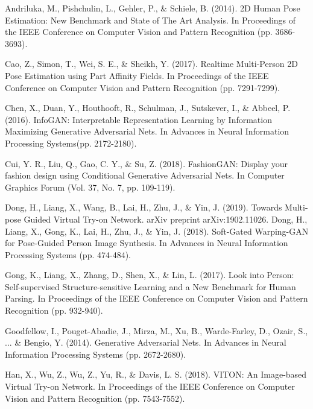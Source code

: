 \documentclass[11pt]{article}
\begin{document}
\medskip
\begin{thebibliography}{34}

Andriluka, M., Pishchulin, L., Gehler, P., \& Schiele, B. (2014). 2D Human Pose Estimation: New Benchmark and State of The Art Analysis. In Proceedings of the IEEE Conference on Computer Vision and Pattern Recognition (pp. 3686-3693).

Cao, Z., Simon, T., Wei, S. E., \& Sheikh, Y. (2017). Realtime Multi-Person 2D Pose Estimation using Part Affinity Fields. In Proceedings of the IEEE Conference on Computer Vision and Pattern Recognition (pp. 7291-7299).

Chen, X., Duan, Y., Houthooft, R., Schulman, J., Sutskever, I., \& Abbeel, P. (2016). InfoGAN: Interpretable Representation Learning by Information Maximizing Generative Adversarial Nets. In Advances in Neural Information Processing Systems(pp. 2172-2180).


Cui, Y. R., Liu, Q., Gao, C. Y., \& Su, Z. (2018). FashionGAN: Display your fashion design using Conditional Generative Adversarial Nets. In Computer Graphics Forum (Vol. 37, No. 7, pp. 109-119).


Dong, H., Liang, X., Wang, B., Lai, H., Zhu, J., \& Yin, J. (2019). Towards Multi-pose Guided Virtual Try-on Network. arXiv preprint arXiv:1902.11026.
Dong, H., Liang, X., Gong, K., Lai, H., Zhu, J., \& Yin, J. (2018). Soft-Gated Warping-GAN for Pose-Guided Person Image Synthesis. In Advances in Neural Information Processing Systems (pp. 474-484).

Gong, K., Liang, X., Zhang, D., Shen, X., \& Lin, L. (2017). Look into Person: Self-supervised Structure-sensitive Learning and a New Benchmark for Human Parsing. In Proceedings of the IEEE Conference on Computer Vision and Pattern Recognition (pp. 932-940).

Goodfellow, I., Pouget-Abadie, J., Mirza, M., Xu, B., Warde-Farley, D., Ozair, S., ... \& Bengio, Y. (2014). Generative Adversarial Nets. In Advances in Neural Information Processing Systems (pp. 2672-2680).

Han, X., Wu, Z., Wu, Z., Yu, R., \& Davis, L. S. (2018). VITON: An Image-based Virtual Try-on Network. In Proceedings of the IEEE Conference on Computer Vision and Pattern Recognition (pp. 7543-7552).


\end{thebibliography}
\end{document}
